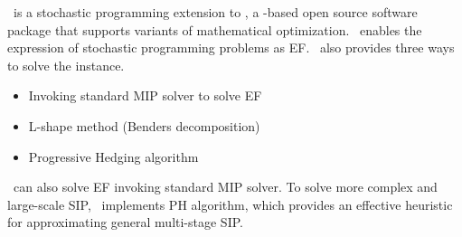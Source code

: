 \pysp\ is a stochastic programming extension to \pyomo, a \python-based open source software package that supports variants of mathematical optimization. \pysp\ enables the expression of stochastic programming problems as EF. \pysp\ also provides three ways to solve the instance. 
\begin{itemize}
	\item Invoking standard MIP solver to solve EF
	\item L-shape method (Benders decomposition)
	\item Progressive Hedging algorithm
\end{itemize}
\pysp\ can also solve EF invoking standard MIP solver. To solve more complex and large-scale SIP, \pysp\ implements PH algorithm, which provides an effective heuristic for approximating general multi-stage SIP.



